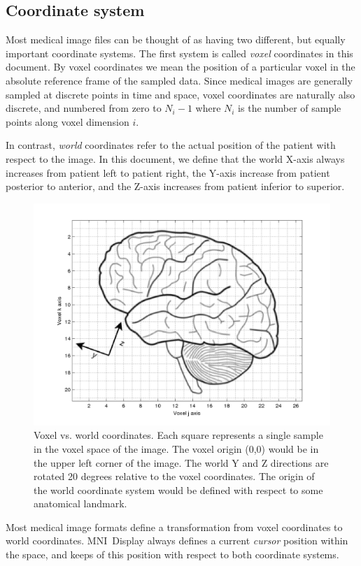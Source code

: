 \documentclass[11pt,letterpaper]{article}
\newcommand{\display}{\mbox{MNI Display}}
\begin{document}
\subsection{Coordinate system}

Most medical image files can be thought of as having two different,
but equally important coordinate systems. The first system is called
{\em voxel} coordinates in this document. By voxel coordinates we mean
the position of a particular voxel in the absolute reference frame of
the sampled data. Since medical images are generally sampled at
discrete points in time and space, voxel coordinates are naturally
also discrete, and numbered from zero to $N_i-1$ where $N_i$ is the
number of sample points along voxel dimension $i$.

In contrast, {\em world} coordinates refer to the actual position of
the patient with respect to the image. In this document, we define
that the world X-axis always increases from patient left to patient
right, the Y-axis increase from patient posterior to anterior, and the
Z-axis increases from patient inferior to superior.

\begin{figure}
\centering
\includegraphics[width=0.75\linewidth]{coordinates.png}
\caption[Voxel vs. world coordinates]{Voxel vs. world coordinates. Each square represents a single sample in the voxel space of the image. The voxel origin (0,0) would be in the upper left corner of the image. The world Y and Z directions
are rotated 20 degrees relative to the voxel coordinates. The origin of the world coordinate system would be defined with respect to some anatomical landmark.}
\label{figCoord}
\end{figure}
Most medical image formats define a transformation from voxel
coordinates to world coordinates. \display{} always defines a current
{\em cursor} position within the space, and keeps of this position
with respect to both coordinate systems.
\end{document}
